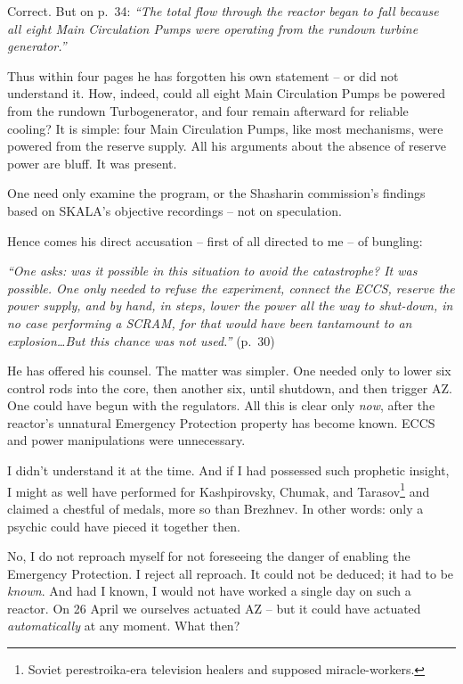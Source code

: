 \documentclass[openright]{bookest}
\begin{document}
Correct. But on p.~34: \textit{``The total flow through the reactor began to fall because all eight Main Circulation Pumps were operating from the rundown turbine generator.''}

Thus within four pages he has forgotten his own statement -- or did not understand it. How, indeed, could all eight Main Circulation Pumps be powered from the rundown Turbogenerator, and four remain afterward for reliable cooling? It is simple: four Main Circulation Pumps, like most mechanisms, were powered from the reserve supply. All his arguments about the absence of reserve power are bluff. It was present.

One need only examine the program, or the Shasharin commission's findings based on SKALA's objective recordings -- not on speculation.

Hence comes his direct accusation -- first of all directed to me -- of bungling:

\begin{personal}
\textit{``One asks: was it possible in this situation to avoid the catastrophe? It was possible. One only needed to refuse the experiment, connect the ECCS, reserve the power supply, and by hand, in steps, lower the power all the way to shut-down, in no case performing a SCRAM, for that would have been tantamount to an explosion\ldots But this chance was not used.''} (p.~30)
\end{personal}

He has offered his counsel. The matter was simpler. One needed only to lower six control rods into the core, then another six, until shutdown, and then trigger AZ. One could have begun with the regulators. All this is clear only \textit{now}, after the reactor's unnatural Emergency Protection property has become known. ECCS and power manipulations were unnecessary.

I didn't understand it at the time. And if I had possessed such prophetic insight, I might as well have performed for Kashpirovsky, Chumak, and Tarasov\footnote{Soviet perestroika-era television healers and supposed miracle-workers.} and claimed a chestful of medals, more so than Brezhnev. In other words: only a psychic could have pieced it together then.

No, I do not reproach myself for not foreseeing the danger of enabling the Emergency Protection. I reject all reproach. It could not be deduced; it had to be \textit{known}. And had I known, I would not have worked a single day on such a reactor. On 26 April we ourselves actuated AZ -- but it could have actuated \textit{automatically} at any moment. What then?
\end{document}
